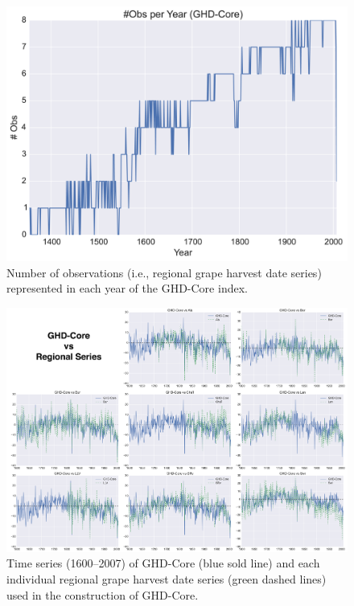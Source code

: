 \documentclass[12pt]{article}
\begin{document}
\begin{figure}
\center
\includegraphics[width=1.0\columnwidth,scale=2]{SUPP_fig_02_numobs.png}
\caption{Number of observations (i.e., regional grape harvest date series) represented in each year of the GHD-Core index.}
\end{figure}

\begin{figure}
\center
\includegraphics[width=1.0\columnwidth,scale=2]{SUPP_fig_03_core_vs_sites.png}
\caption{Time series (1600--2007) of GHD-Core (blue sold line) and each individual regional grape harvest date series (green dashed lines) used in the construction of GHD-Core.}
\end{figure}
\end{document}
